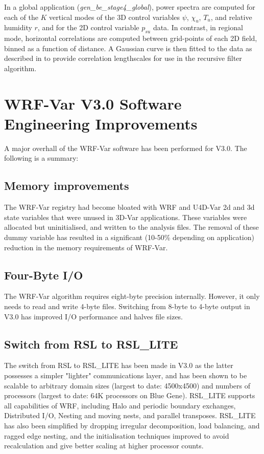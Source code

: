 In a global application ({\it gen\_be\_stage4\_global}), power spectra
are computed for each of the $K$ vertical modes of the 3D control
variables $\psi$, $\chi_u$, $T_u$, and relative humidity $r$, and for the 2D control
variable $p_{su}$ data. In contrast, in regional mode, horizontal
correlations are computed between grid-points of each 2D field, binned
as a function of distance. A Gaussian curve is then fitted to the data
as described in \citet{barker04} to provide correlation lengthscales
for use in the recursive filter algorithm.

\section{WRF-Var V3.0 Software Engineering Improvements}
\label{se}

A major overhall of the WRF-Var software has been performed for V3.0. The following
is a summary:

\subsection{Memory improvements}

The WRF-Var registry had become bloated with WRF and U4D-Var 2d and 3d state variables that were unused in 
3D-Var applications. These variables were allocated but uninitialised, and written to the analysis files. The removal 
of these dummy variable has resulted in a significant (10-50\% depending on application) reduction in the memory 
requirements of WRF-Var.

\subsection{Four-Byte I/O}

The WRF-Var algorithm requires eight-byte precision internally. However, it only needs to read and write 4-byte files. 
Switching from 8-byte to 4-byte output in V3.0 has improved I/O performance and halves file sizes.

\subsection{Switch from RSL to RSL\_LITE}

The switch from RSL to RSL\_LITE has been made in V3.0 as the latter possesses 
a simpler "lighter" communications layer, and has been shown to be scalable 
to arbitrary domain sizes (largest to date: 4500x4500) and numbers of processors 
(largest to date: 64K processors on Blue Gene). RSL\_LITE supports all capabilities of WRF, 
including Halo and periodic boundary exchanges, Distributed I/O, Nesting and moving nests, 
and parallel transposes. RSL\_LITE has also been simplified by dropping irregular decomposition, 
load balancing, and ragged edge nesting, and the initialisation techniques improved 
to avoid recalculation and give better scaling at higher processor counts.

